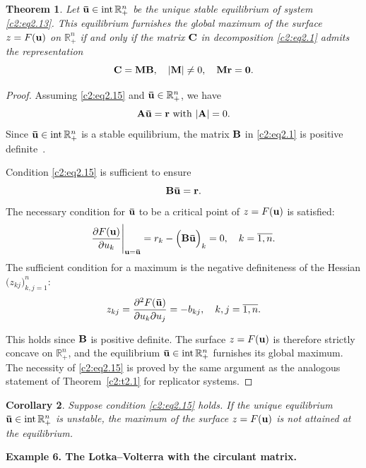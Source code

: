 \documentclass[12pt]{report}
\newcommand{\R}{\mathbb{R}}
\newcommand{\inside}{\mathrm{int}\,}
\newtheorem{theorem}{Theorem}[section]
\newtheorem{conseq}[theorem]{Corollary}
\theoremstyle{definition}
\theoremstyle{remark}
\begin{document}
\begin{theorem}\label{c2:t2.6}
	Let ${\bf \bar{u}} \in \inside \mathbb{R}_+^n$ be the unique stable equilibrium of system \eqref{c2:eq2.13}. This equilibrium furnishes the global maximum of the surface $z=F({\bf u})$ on $\mathbb{R}_+^n$ if and only if the matrix ${\bf C}$ in decomposition \eqref{c2:eq2.1} admits the representation
	\begin{equation}\label{c2:eq2.15}
		{\bf C=MB}, \quad |{\bf M}| \neq 0, \quad {\bf Mr=0}.
	\end{equation}
\end{theorem}
\begin{proof}
	Assuming \eqref{c2:eq2.15} and ${\bf \bar{u}} \in \mathbb{R}_+^n$, we have 
    $${\bf A\bar{u}} = {\bf r} \text{ with } |{\bf A}| = 0.$$
	Since ${\bf \bar{u}} \in \inside \R_{+}^{n}$ is a stable equilibrium, the matrix ${\bf B}$ in \eqref{c2:eq2.1} is positive definite~\cite{c2:Svirezhev1978}.
	
	Condition \eqref{c2:eq2.15} is sufficient to ensure
	\begin{equation}
		{\bf B\bar{u}} = {\bf r}.
		\label{c2:eq2.16}
	\end{equation}
	The necessary condition for ${\bf \bar{u}}$ to be a critical point of $z = F({\bf u})$ is satisfied:
	$$
	\frac{\partial F({\bf u})}{\partial u_{k}}\Bigg|_{{\bf u} = {\bf \bar{u}}} = r_{k} - \Big({\bf B\bar{u}}\Big)_{k} = 0, \quad k = \overline{1, n}.
	$$
	The sufficient condition for a maximum is the negative definiteness of the Hessian $\Big(z_{kj}\Big)_{k, j = 1}^{n}$:
	$$
	z_{kj} = \frac{\partial^{2}F({\bf \bar{u}})}{\partial u_{k}\partial u_{j}} = -b_{kj}, \quad k, j = \overline{1, n}.
	$$
	
	This holds since ${\bf B}$ is positive definite. The surface $z = F({\bf u})$ is therefore strictly concave on $\R_{+}^{n}$, and the equilibrium ${\bf \bar{u}} \in \inside \R_{+}^{n}$ furnishes its global maximum.
	The necessity of \eqref{c2:eq2.15} is proved by the same argument as the analogous statement of Theorem~\ref{c2:t2.1} for replicator systems. 
\end{proof}

\begin{conseq}\label{c2:con2.4}
	Suppose condition \eqref{c2:eq2.15} holds. If the unique equilibrium ${\bf \bar{u}} \in \inside \R_{+}^{n}$ is unstable, the maximum of the surface $z = F({\bf u})$ is not attained at the equilibrium.
\end{conseq}

\medskip
\textbf{Example 6. The Lotka--Volterra with the circulant matrix.}
\end{document}
